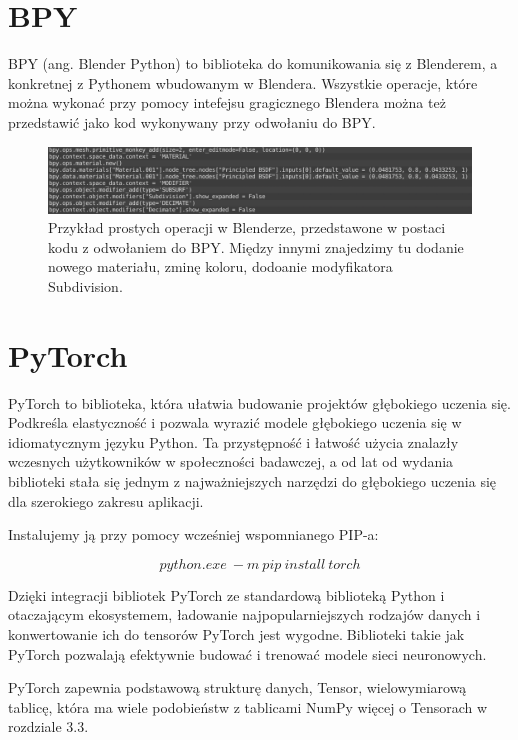 \documentclass[brudnopis]{xmgr}
\begin{document}
  \section{BPY\label{s:dsssl}}
  
  BPY (ang. Blender Python) to biblioteka do komunikowania się z Blenderem, a konkretnej z Pythonem wbudowanym w Blendera. Wszystkie operacje, które można wykonać przy pomocy intefejsu gragicznego Blendera można też przedstawić jako kod wykonywany przy odwołaniu do BPY.
  
  
  \begin{figure}[!tbh]
\centering
\includegraphics[width=1.2\hsize]{fig/8}
\caption{Przykład prostych operacji w Blenderze, przedstawone w postaci kodu z odwołaniem do BPY. Między innymi znajedzimy tu dodanie nowego materiału, zminę koloru, dodoanie modyfikatora Subdivision.\label{RYS.3}}
\end{figure}
  
    \section{PyTorch\label{s:dsssl}}
    
    
PyTorch to biblioteka, która ułatwia budowanie projektów głębokiego uczenia się. Podkreśla elastyczność i pozwala wyrazić modele głębokiego uczenia się w idiomatycznym języku Python. Ta przystępność i łatwość użycia znalazły wczesnych użytkowników w społeczności badawczej, a od lat od wydania biblioteki stała się jednym z najważniejszych narzędzi do głębokiego uczenia się dla szerokiego zakresu aplikacji.

Instalujemy ją przy pomocy wcześniej wspomnianego PIP-a:

\begin{equation}
python.exe\:-m\:pip\:install\:torch
\end{equation}

Dzięki integracji bibliotek PyTorch ze standardową biblioteką Python i otaczającym ekosystemem, ładowanie najpopularniejszych rodzajów danych i konwertowanie ich do tensorów PyTorch jest wygodne.􏰹Biblioteki takie jak PyTorch pozwalają efektywnie budować i trenować modele sieci neuronowych.

PyTorch zapewnia podstawową strukturę danych, Tensor, wielowymiarową tablicę, która ma wiele podobieństw z tablicami NumPy więcej o Tensorach w rozdziale 3.3.
\end{document}
